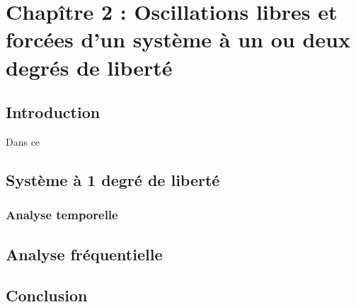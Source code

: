 

\section{Chapître 2 : Oscillations libres et forcées d'un système à un ou deux degrés de liberté}

\subsection{Introduction}

Dans ce
\subsection{Système à 1 degré de liberté}
\subsubsection{Analyse temporelle}
\subsection{Analyse fréquentielle}
\subsection{Conclusion}






